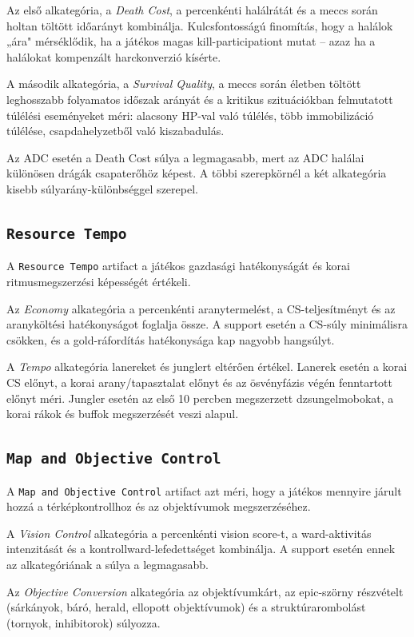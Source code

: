﻿\documentclass[a4paper,12pt]{report}
\begin{document}
Az első alkategória, a \emph{Death Cost}, a percenkénti halálrátát és a meccs során holtan töltött időarányt kombinálja. Kulcsfontosságú finomítás, hogy a halálok „ára" mérséklődik, ha a játékos magas kill-participationt mutat -- azaz ha a halálokat kompenzált harckonverzió kísérte.

A második alkategória, a \emph{Survival Quality}, a meccs során életben töltött leghosszabb folyamatos időszak arányát és a kritikus szituációkban felmutatott túlélési eseményeket méri: alacsony HP-val való túlélés, több immobilizáció túlélése, csapdahelyzetből való kiszabadulás.

Az ADC esetén a Death Cost súlya a legmagasabb, mert az ADC halálai különösen drágák csapaterőhöz képest. A többi szerepkörnél a két alkategória kisebb súlyarány-különbséggel szerepel.

\subsection{\texttt{Resource Tempo}}

A \texttt{Resource Tempo} artifact a játékos gazdasági hatékonyságát és korai ritmusmegszerzési képességét értékeli.

Az \emph{Economy} alkategória a percenkénti aranytermelést, a CS-teljesítményt és az aranyköltési hatékonyságot foglalja össze. A support esetén a CS-súly minimálisra csökken, és a gold-ráfordítás hatékonysága kap nagyobb hangsúlyt.

A \emph{Tempo} alkategória lanereket és junglert eltérően értékel. Lanerek esetén a korai CS előnyt, a korai arany/tapasztalat előnyt és az ösvényfázis végén fenntartott előnyt méri. Jungler esetén az első 10 percben megszerzett dzsungelmobokat, a korai rákok és buffok megszerzését veszi alapul.

\subsection{\texttt{Map and Objective Control}}

A \texttt{Map and Objective Control} artifact azt méri, hogy a játékos mennyire járult hozzá a térképkontrollhoz és az objektívumok megszerzéséhez.

A \emph{Vision Control} alkategória a percenkénti vision score-t, a ward-aktivitás intenzitását és a kontrollward-lefedettséget kombinálja. A support esetén ennek az alkategóriának a súlya a legmagasabb.

Az \emph{Objective Conversion} alkategória az objektívumkárt, az epic-szörny részvételt (sárkányok, báró, herald, ellopott objektívumok) és a struktúrarombolást (tornyok, inhibitorok) súlyozza.
\end{document}
